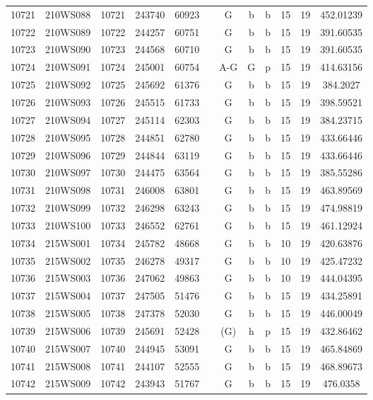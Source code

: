 \begin{tabular}{|*{12}{c|}}
10721 & 210WS088 & 10721 & 243740 & 60923 &  & G & b & b & 15 & 19 & 452.01239 \\ 
10722 & 210WS089 & 10722 & 244257 & 60751 &  & G & b & b & 15 & 19 & 391.60535 \\ 
10723 & 210WS090 & 10723 & 244568 & 60710 &  & G & b & b & 15 & 19 & 391.60535 \\ 
10724 & 210WS091 & 10724 & 245001 & 60754 &  & A-G & G & p & 15 & 19 & 414.63156 \\ 
10725 & 210WS092 & 10725 & 245692 & 61376 &  & G & b & b & 15 & 19 & 384.2027 \\ 
10726 & 210WS093 & 10726 & 245515 & 61733 &  & G & b & b & 15 & 19 & 398.59521 \\ 
10727 & 210WS094 & 10727 & 245114 & 62303 &  & G & b & b & 15 & 19 & 384.23715 \\ 
10728 & 210WS095 & 10728 & 244851 & 62780 &  & G & b & b & 15 & 19 & 433.66446 \\ 
10729 & 210WS096 & 10729 & 244844 & 63119 &  & G & b & b & 15 & 19 & 433.66446 \\ 
10730 & 210WS097 & 10730 & 244475 & 63564 &  & G & b & b & 15 & 19 & 385.55286 \\ 
10731 & 210WS098 & 10731 & 246008 & 63801 &  & G & b & b & 15 & 19 & 463.89569 \\ 
10732 & 210WS099 & 10732 & 246298 & 63243 &  & G & b & b & 15 & 19 & 474.98819 \\ 
10733 & 210WS100 & 10733 & 246552 & 62761 &  & G & b & b & 15 & 19 & 461.12924 \\ 
10734 & 215WS001 & 10734 & 245782 & 48668 &  & G & b & b & 10 & 19 & 420.63876 \\ 
10735 & 215WS002 & 10735 & 246278 & 49317 &  & G & b & b & 10 & 19 & 425.47232 \\ 
10736 & 215WS003 & 10736 & 247062 & 49863 &  & G & b & b & 10 & 19 & 444.04395 \\ 
10737 & 215WS004 & 10737 & 247505 & 51476 &  & G & b & b & 15 & 19 & 434.25891 \\ 
10738 & 215WS005 & 10738 & 247378 & 52030 &  & G & b & b & 15 & 19 & 446.00049 \\ 
10739 & 215WS006 & 10739 & 245691 & 52428 &  & (G) & h & p & 15 & 19 & 432.86462 \\ 
10740 & 215WS007 & 10740 & 244945 & 53091 &  & G & b & b & 15 & 19 & 465.84869 \\ 
10741 & 215WS008 & 10741 & 244107 & 52555 &  & G & b & b & 15 & 19 & 468.89673 \\ 
10742 & 215WS009 & 10742 & 243943 & 51767 &  & G & b & b & 15 & 19 & 476.0358 \\ 

\end{tabular}

